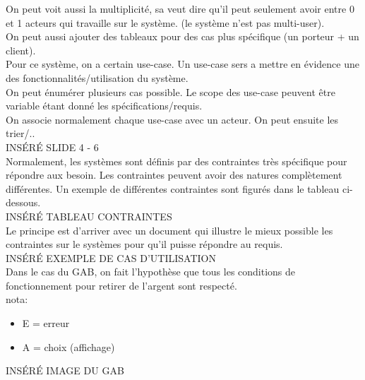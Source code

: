 \documentclass[oneside]{book}
\begin{document}
    On peut voit aussi la multiplicité, sa veut dire qu'il peut seulement avoir entre 0 et 1 acteurs qui travaille sur le système. (le système n'est pas multi-user).\\
    
    On peut aussi ajouter des tableaux pour des cas plus spécifique (un porteur + un client).\\
    
    Pour ce système, on a certain use-case. Un use-case sers a mettre en évidence une des fonctionnalités/utilisation du système.\\
    
    On peut énumérer plusieurs cas possible. Le scope des use-case peuvent être variable étant donné les spécifications/requis.\\
    
    On associe normalement chaque use-case avec un acteur. On peut ensuite les trier/..\\
    
    INSÉRÉ SLIDE 4 - 6\\
    
    Normalement, les systèmes sont définis par des contraintes très spécifique pour répondre aux besoin. Les contraintes peuvent avoir des natures complètement différentes. Un exemple de différentes contraintes sont figurés dans le tableau ci-dessous.\\
    
    INSÉRÉ TABLEAU CONTRAINTES\\
    
    Le principe est d'arriver avec un document qui illustre le mieux possible les contraintes sur le systèmes pour qu'il puisse répondre au requis.\\
    
    INSÉRÉ EXEMPLE DE CAS D'UTILISATION\\
    
    Dans le cas du GAB, on fait l'hypothèse que tous les conditions de fonctionnement pour retirer de l'argent sont respecté.\\
    
    nota:
    \begin{itemize}
        \item E = erreur
        \item A = choix (affichage)
    \end{itemize}
    
    INSÉRÉ IMAGE DU GAB\\
    
    
    
\end{document}
